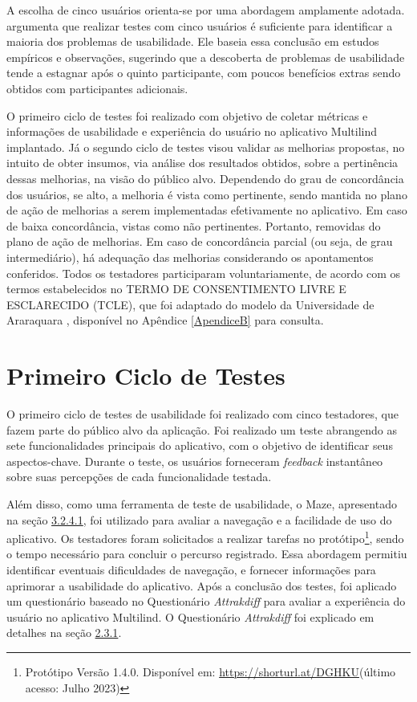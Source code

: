 A escolha de cinco usuários orienta-se por uma abordagem amplamente adotada.  argumenta que realizar testes com cinco usuários é suficiente para identificar a maioria dos problemas de 
usabilidade. Ele baseia essa conclusão em estudos empíricos e observações, sugerindo que a descoberta de problemas de usabilidade tende a estagnar após o quinto participante, com poucos benefícios 
extras sendo obtidos com participantes adicionais.

O primeiro ciclo de testes foi realizado com objetivo de coletar métricas e informações de usabilidade e experiência do usuário no aplicativo Multilind implantado. Já o segundo ciclo de testes visou validar as 
melhorias propostas, no intuito de obter insumos, via análise dos resultados obtidos, sobre a pertinência dessas melhorias, na visão do público alvo. Dependendo do grau de concordância dos usuários, se alto, a 
melhoria é vista como pertinente, sendo mantida no plano de ação de melhorias a serem implementadas efetivamente no aplicativo. Em caso de baixa concordância, vistas como não pertinentes. Portanto, removidas 
do plano de ação de melhorias. Em caso de concordância parcial (ou seja, de grau intermediário), há adequação das melhorias considerando os apontamentos conferidos. Todos os testadores participaram voluntariamente, 
de acordo com os termos estabelecidos no  TERMO DE CONSENTIMENTO LIVRE E ESCLARECIDO (TCLE), que foi adaptado do modelo da Universidade de Araraquara \cite{tcle}, disponível no Apêndice \ref{ApendiceB} para consulta.
 
\section{Primeiro Ciclo de Testes}
\label{sec:Primeiro Ciclo}
O primeiro ciclo de testes de usabilidade foi realizado com cinco testadores, que fazem parte do público alvo da aplicação. Foi realizado um teste abrangendo as sete funcionalidades 
principais do aplicativo, com o objetivo de identificar seus aspectos-chave. Durante o teste, os usuários forneceram \textit{feedback} instantâneo sobre suas percepções de cada funcionalidade testada. 

Além disso, como uma ferramenta de teste de usabilidade, o Maze, apresentado na seção \hyperref[{sec:Maze}]{3.2.4.1}, foi utilizado para avaliar a navegação e a facilidade de uso do aplicativo. Os testadores foram solicitados a realizar  
tarefas no protótipo\footnote{Protótipo Versão 1.4.0. Disponível em: \url{https://shorturl.at/DGHKU}(último acesso: Julho 2023)},  sendo o tempo
necessário para concluir o percurso registrado. Essa abordagem permitiu identificar eventuais dificuldades de navegação, e fornecer informações para aprimorar a usabilidade do aplicativo. Após a conclusão dos 
testes, foi aplicado um questionário baseado no Questionário \textit{Attrakdiff} para avaliar a experiência do usuário no aplicativo Multilind. O Questionário \textit{Attrakdiff} foi explicado em detalhes na seção \hyperref[sec:Medicao2]{2.3.1}.

